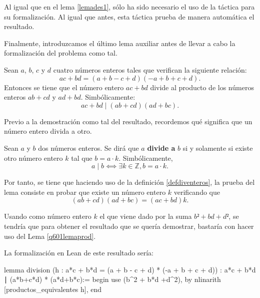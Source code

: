 Al igual que en el lema \ref{lemades1}, sólo ha sido necesario el uso de
la táctica  para su formalización. Al igual
que antes, esta táctica prueba de manera automática el resultado.

Finalmente, introduzcamos el último lema auxiliar antes de llevar a cabo
la formalización del problema como tal.

\begin{lema}[division]\label{lemadivisionq6}
  Sean \(a\), \(b\), \(c\) y \(d\) cuatro números enteros tales que
  verifican la siguiente relación:
    \begin{equation}\tag{h}
      ac+bd = (a+b-c+d)(-a+b+c+d).
    \end{equation}
    Entonces se tiene que el número entero \(ac+bd\) divide al producto de
    los números enteros \(ab+cd\) y \(ad+bd\). Simbólicamente:
    \begin{equation}
      ac+bd ∣ (ab+cd)(ad+bc).
    \end{equation}
\end{lema}

\begin{demostracion}
  Previo a la demostración como tal del resultado, recordemos qué significa que
  un número entero divida a otro.
  \begin{definicion}\label{defdiventeros}
    Sean \(a\) y \(b\) dos números enteros. Se dirá que \(a\)
    \textbf{divide a} \(b\) si y solamente si existe otro número entero
    \(k\) tal que \(b = a · k\).  Simbólicamente,
    \begin{equation}
    a \mid b ⟺ ∃ k ∈ ℤ, b = a · k.
    \end{equation}
  \end{definicion}

  Por tanto, se tiene que haciendo uso de la definición \ref{defdiventeros},
  la prueba del lema consiste en probar que existe un número entero \(k\)
  verificando que
  \begin{equation}
    (ab+cd)(ad+bc)=(ac+bd)k.
  \end{equation}

  Usando como número entero \(k\) el que viene dado por la suma \(b²+bd+d²\),
  se tendría que para obtener el resultado que se quería demostrar, bastaría
  con hacer uso del Lema \ref{q601lemaprod}.
\end{demostracion}

La formalización en Lean de este resultado sería:
\begin{leancode}
lemma division
  (h : a*c + b*d = (a + b - c + d) * (-a + b + c + d))
  : a*c + b*d ∣ (a*b+c*d) * (a*d+b*c):=
begin
  use (b^2 + b*d +d^2),
  by nlinarith [productos_equivalentes h],
end
\end{leancode}

